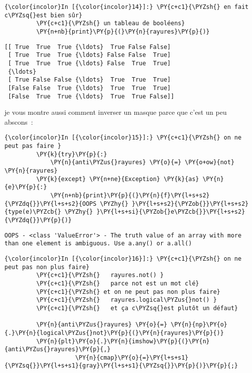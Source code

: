     \begin{Verbatim}[commandchars=\\\{\}]
{\color{incolor}In [{\color{incolor}14}]:} \PY{c+c1}{\PYZsh{} en fait c\PYZsq{}est bien sûr}
         \PY{c+c1}{\PYZsh{} un tableau de booléens}
         \PY{n+nb}{print}\PY{p}{(}\PY{n}{rayures}\PY{p}{)}
\end{Verbatim}


    \begin{Verbatim}[commandchars=\\\{\}]
[[ True  True  True {\ldots}  True False False]
 [ True  True  True {\ldots} False False  True]
 [ True  True  True {\ldots} False  True  True]
 {\ldots}
 [ True False False {\ldots}  True  True  True]
 [False False  True {\ldots}  True  True  True]
 [False  True  True {\ldots}  True  True False]]

    \end{Verbatim}

    je vous montre aussi comment inverser un masque parce que c'est un peu
abscons~:

    \begin{Verbatim}[commandchars=\\\{\}]
{\color{incolor}In [{\color{incolor}15}]:} \PY{c+c1}{\PYZsh{} on ne peut pas faire }
         \PY{k}{try}\PY{p}{:}
             \PY{n}{anti\PYZus{}rayures} \PY{o}{=} \PY{o+ow}{not} \PY{n}{rayures}
         \PY{k}{except} \PY{n+ne}{Exception} \PY{k}{as} \PY{n}{e}\PY{p}{:}
             \PY{n+nb}{print}\PY{p}{(}\PY{n}{f}\PY{l+s+s2}{\PYZdq{}}\PY{l+s+s2}{OOPS \PYZhy{} }\PY{l+s+s2}{\PYZob{}}\PY{l+s+s2}{type(e)\PYZcb{} \PYZhy{} }\PY{l+s+si}{\PYZob{}e\PYZcb{}}\PY{l+s+s2}{\PYZdq{}}\PY{p}{)}
\end{Verbatim}


    \begin{Verbatim}[commandchars=\\\{\}]
OOPS - <class 'ValueError'> - The truth value of an array with more than one element is ambiguous. Use a.any() or a.all()

    \end{Verbatim}

    \begin{Verbatim}[commandchars=\\\{\}]
{\color{incolor}In [{\color{incolor}16}]:} \PY{c+c1}{\PYZsh{} on ne peut pas non plus faire}
         \PY{c+c1}{\PYZsh{}   rayures.not() }
         \PY{c+c1}{\PYZsh{}   parce not est un mot clé}
         \PY{c+c1}{\PYZsh{} et on ne peut pas non plus faire}
         \PY{c+c1}{\PYZsh{}   rayures.logical\PYZus{}not() }
         \PY{c+c1}{\PYZsh{}   et ça c\PYZsq{}est plutôt un défaut}
         
         \PY{n}{anti\PYZus{}rayures} \PY{o}{=} \PY{n}{np}\PY{o}{.}\PY{n}{logical\PYZus{}not}\PY{p}{(}\PY{n}{rayures}\PY{p}{)}
         \PY{n}{plt}\PY{o}{.}\PY{n}{imshow}\PY{p}{(}\PY{n}{anti\PYZus{}rayures}\PY{p}{,} 
                    \PY{n}{cmap}\PY{o}{=}\PY{l+s+s1}{\PYZsq{}}\PY{l+s+s1}{gray}\PY{l+s+s1}{\PYZsq{}}\PY{p}{)}\PY{p}{;}
\end{Verbatim}


